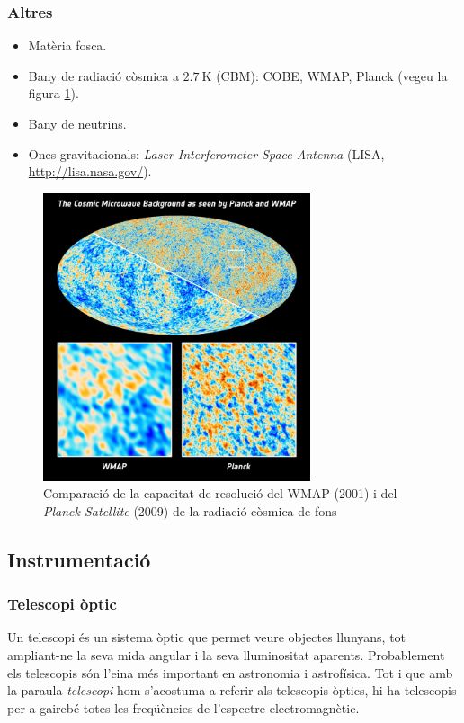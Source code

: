 \subsubsection*{Altres}
\begin{itemize}
	\item Matèria fosca.
	\item Bany de radiació còsmica a $\SI{2.7}{\K}$ (CBM): COBE, WMAP, Planck (vegeu la figura \ref{fig:wmap-planck}).
	\item Bany de neutrins.
	\item Ones gravitacionals: \textit{Laser Interferometer Space Antenna} (LISA, \url{http://lisa.nasa.gov/}).
\end{itemize}
\begin{figure}[H]
	\centering
	\includegraphics[width=0.7\textwidth]{./images/1-wmap-planck}
	\caption{Comparació de la capacitat de resolució del WMAP (2001) i del \textit{Planck Satellite} (2009) de la radiació còsmica de fons}
	\label{fig:wmap-planck}
\end{figure}

\subsection{Instrumentació}
\subsubsection*{Telescopi òptic}
Un telescopi és un sistema òptic que permet veure objectes llunyans, tot ampliant-ne la seva mida angular i la seva lluminositat aparents. Probablement els telescopis són l'eina més important en astronomia i astrofísica. Tot i que amb la paraula \textit{telescopi} hom s'acostuma a referir als telescopis òptics, hi ha telescopis per a gairebé totes les freqüències de l'espectre electromagnètic.

